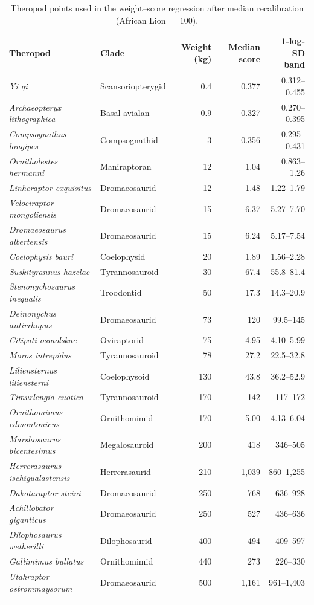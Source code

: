 \documentclass[11pt]{article}
\begin{document}
\small
\begin{longtable}{llrrr}
\toprule
Theropod & Clade & Weight (kg) & Median score & 1-log-SD band \\
\midrule
\endhead
\textit{Yi qi} & Scansoriopterygid & 0.4 & 0.377 & 0.312--0.455 \\
\textit{Archaeopteryx lithographica} & Basal avialan & 0.9 & 0.327 & 0.270--0.395 \\
\textit{Compsognathus longipes} & Compsognathid & 3 & 0.356 & 0.295--0.431 \\
\textit{Ornitholestes hermanni} & Maniraptoran & 12 & 1.04 & 0.863--1.26 \\
\textit{Linheraptor exquisitus} & Dromaeosaurid & 12 & 1.48 & 1.22--1.79 \\
\textit{Velociraptor mongoliensis} & Dromaeosaurid & 15 & 6.37 & 5.27--7.70 \\
\textit{Dromaeosaurus albertensis} & Dromaeosaurid & 15 & 6.24 & 5.17--7.54 \\
\textit{Coelophysis bauri} & Coelophysid & 20 & 1.89 & 1.56--2.28 \\
\textit{Suskityrannus hazelae} & Tyrannosauroid & 30 & 67.4 & 55.8--81.4 \\
\textit{Stenonychosaurus inequalis} & Troodontid & 50 & 17.3 & 14.3--20.9 \\
\textit{Deinonychus antirrhopus} & Dromaeosaurid & 73 & 120 & 99.5--145 \\
\textit{Citipati osmolskae} & Oviraptorid & 75 & 4.95 & 4.10--5.99 \\
\textit{Moros intrepidus} & Tyrannosauroid & 78 & 27.2 & 22.5--32.8 \\
\textit{Liliensternus liliensterni} & Coelophysoid & 130 & 43.8 & 36.2--52.9 \\
\textit{Timurlengia euotica} & Tyrannosauroid & 170 & 142 & 117--172 \\
\textit{Ornithomimus edmontonicus} & Ornithomimid & 170 & 5.00 & 4.13--6.04 \\
\textit{Marshosaurus bicentesimus} & Megalosauroid & 200 & 418 & 346--505 \\
\textit{Herrerasaurus ischigualastensis} & Herrerasaurid & 210 & 1,039 & 860--1,255 \\
\textit{Dakotaraptor steini} & Dromaeosaurid & 250 & 768 & 636--928 \\
\textit{Achillobator giganticus} & Dromaeosaurid & 250 & 527 & 436--636 \\
\textit{Dilophosaurus wetherilli} & Dilophosaurid & 400 & 494 & 409--597 \\
\textit{Gallimimus bullatus} & Ornithomimid & 440 & 273 & 226--330 \\
\textit{Utahraptor ostrommaysorum} & Dromaeosaurid & 500 & 1,161 & 961--1,403 \\
\bottomrule
\caption{Theropod points used in the weight--score regression after median recalibration (African Lion $=100$).}
\label{tab:theropod_weights}
\end{longtable}
\normalsize
\end{document}
